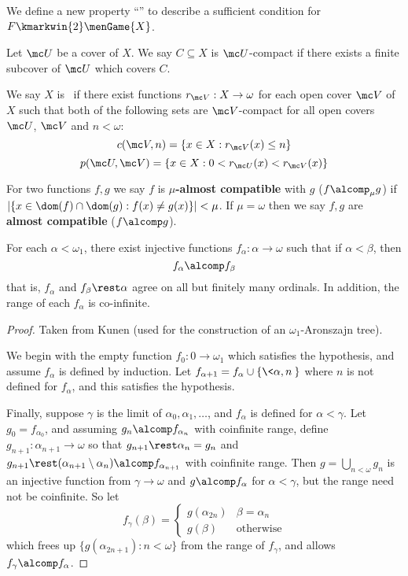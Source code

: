   We define a new property ``\scish'' to describe a sufficient condition for $F \kmarkwin{2}\menGame{X}$.

  \begin{defn}
    Let $\mc U$ be a cover of $X$. We say $C\subseteq X$ is $\mc U$-compact if there exists a finite subcover of $\mc U$ which covers $C$.

    We say $X$ is \scish~if there exist functions $r_{\mc V}:X\to\omega$ for each open cover $\mc V$ of $X$ such that both of the following sets are $\mc V$-compact for all open covers $\mc U$, $\mc V$ and $n<\omega$:
      \[
        c(\mc V,n)=\{ x\in X : r_{\mc V}(x)\leq n\}
      \]
      \[
        p(\mc U,\mc V)=\{ x\in X : 0<r_{\mc U}(x)<r_{\mc V}(x)\}
      \]
  \end{defn}

  \begin{defn}
    For two functions $f,g$ we say $f$ is \textbf{$\mu$-almost compatible} with $g$ ($f\alcomp_\mu g$) if $|\{x\in\dom(f)\cap\dom(g):f(x)\not=g(x)\}|<\mu$. If $\mu=\omega$ then we say $f,g$ are \textbf{almost compatible} ($f\alcomp g$).
  \end{defn}

  \begin{lem}\label{kunlem}
    For each $\alpha<\omega_1$, there exist injective functions $f_\alpha:\alpha\to\omega$ such that if $\alpha<\beta$, then \[f_\alpha \alcomp f_\beta\] that is, $f_\alpha$ and $f_\beta\rest\alpha$ agree on all but finitely many ordinals. In addition, the range of each $f_\alpha$ is co-infinite.
  \end{lem}

  \begin{proof}
    Taken from Kunen (used for the construction of an $\omega_1$-Aronszajn tree).

    We begin with the empty function $f_0:0\to\omega_1$ which satisfies the hypothesis, and assume $f_\alpha$ is defined by induction. Let $f_{\alpha+1} = f_\alpha \cup \{\<\alpha,n\>\}$ where $n$ is not defined for $f_\alpha$, and this satisfies the hypothesis.

    Finally, suppose $\gamma$ is the limit of $\alpha_0,\alpha_1,\dots$, and $f_\alpha$ is defined for $\alpha<\gamma$. Let $g_0=f_{\alpha_0}$, and assuming $g_n\alcomp f_{\alpha_n}$ with coinfinite range, define $g_{n+1}:\alpha_{n+1}\to\omega$ so that $g_{n+1}\rest\alpha_n=g_n$ and $g_{n+1}\rest(\alpha_{n+1}\setminus\alpha_n)\alcomp f_{\alpha_{n+1}}$ with coinfinite range. Then $g=\bigcup_{n<\omega} g_n$ is an injective function from $\gamma \to \omega$ and $g \alcomp f_\alpha$ for $\alpha <\gamma$, but the range need not be coinfinite. So let
    \[
      f_\gamma(\beta) = \left\{
      \begin{array}{ll}
        g(\alpha_{2n}) & \beta = \alpha_n \\
        g(\beta) & \text{otherwise}
      \end{array}
      \right.
    \]
    which frees up $\{g(\alpha_{2n+1}):n<\omega\}$ from the range of $f_\gamma$, and allows $f_\gamma\alcomp f_\alpha$.
  \end{proof}


